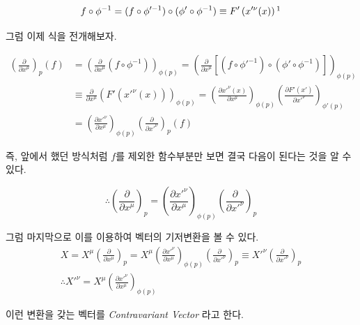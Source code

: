 \documentclass[paper=a4, fontsize=11pt]{scrartcl} %
\numberwithin{equation}{section} %
\numberwithin{figure}{section} %
\numberwithin{table}{section} %
\theoremstyle{plain}
\newcommand{\PD}[2]{\frac{\partial #1}{\partial #2}}
\newcommand{\BKS}[1]{\left( #1 \right)}
\newcommand{\Basis}[1][\mu]{\BKS{\PD{}{x^{#1}}}_p}
\begin{document}
\begin{equation*}
 f\circ\phi^{-1} = (f\circ\phi'^{-1})\circ(\phi'\circ\phi^{-1}) \equiv F'\BKS{x'^{\nu} (x)}\footnotemark
\end{equation*}

그럼 이제 식을 전개해보자.

\begin{equation}
  \begin{split}
    \Basis (f) & = \BKS{\PD{}{x^{\mu}} (f\circ\phi^{-1})}_{\phi(p)} = \BKS{\PD{}{x^{\mu}} \left[ (f\circ\phi'^{-1})\circ(\phi'\circ\phi^{-1}) \right]}_{\phi(p)} \\
    & \equiv \PD{}{x^{\mu}} \BKS{F'(x'^{\nu}(x))}_{\phi(p)} = \BKS{\PD{x'^{\nu}(x)}{x^{\mu}}}_{\phi(p)}\BKS{\PD{F'(x')}{x'^{\nu}}}_{\phi'(p)} \\
    & = \BKS{\PD{x'^{\nu}}{x^{\mu}}}_{\phi(p)}\BKS{\PD{}{x'^{\nu}}}_p (f)
  \end{split}
\end{equation}

즉, 앞에서 했던 방식처럼 $f$를 제외한 함수부분만 보면 결국 다음이 된다는 것을 알 수 있다.

\begin{equation}
 \therefore \Basis = \BKS{\PD{x'^{\nu}}{x^{\mu}}}_{\phi(p)}\BKS{\PD{}{x'^{\nu}}}_p
\end{equation}

그럼 마지막으로 이를 이용하여 벡터의 기저변환을 볼 수 있다.
\begin{gather}
 X = X^{\mu} \Basis = X^{\mu} \BKS{\PD{x'^{\nu}}{x^{\mu}}}_{\phi(p)} \BKS{\PD{}{x'^{\nu}}}_p \equiv X'^{\nu} \BKS{\PD{}{x'^{\nu}}}_p \\
 \therefore X'^{\nu} = X^{\mu} \BKS{\PD{x'^{\nu}}{x^{\mu}}}_{\phi(p)}
\end{gather}

이런 변환을 갖는 벡터를 \emph{Contravariant Vector} 라고 한다.

\pagebreak
\end{document}
